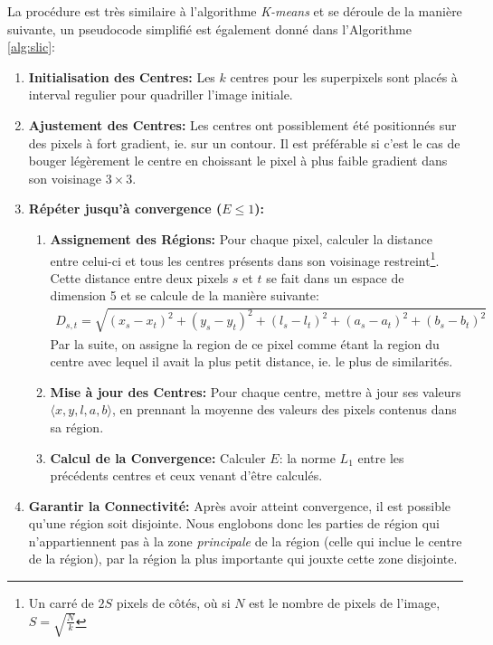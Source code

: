 \documentclass[12pt]{article}
\begin{document}
La proc\'edure est tr\`es similaire \`a l'algorithme \textit{K-means} et se d\'eroule de la mani\`ere suivante, un pseudocode simplifi\'e est \'egalement donn\'e dans l'Algorithme \ref{alg:slic}:

\begin{enumerate}
  \item \textbf{Initialisation des Centres:} Les $k$ centres pour les superpixels sont plac\'es \`a interval regulier pour quadriller l'image initiale.
  \item \textbf{Ajustement des Centres:} Les centres ont possiblement \'et\'e positionn\'es sur des pixels \`a fort gradient, ie. sur un contour.
        Il est pr\'ef\'erable si c'est le cas de bouger l\'eg\`erement le centre en choissant le pixel \`a plus faible gradient dans son voisinage $3\times 3$.
  \item \textbf{R\'ep\'eter jusqu'\`a convergence ($E \leq 1$):}
        \begin{enumerate}
          \item \textbf{Assignement des R\'egions:} Pour chaque pixel, calculer la distance entre celui-ci et tous les centres pr\'esents dans son voisinage restreint\footnote{Un carr\'e de $2S$ pixels de c\^ot\'es, o\`u si $N$ est le nombre de pixels de l'image, $S=\sqrt{\frac{N}{k}}$}.
                Cette distance entre deux pixels $s$ et $t$ se fait dans un espace de dimension 5 et se calcule de la mani\`ere suivante:
                \begin{align*}
                  D_{s,t} = \sqrt{(x_s - x_t)^2 + (y_s - y_t)^2 + (l_s - l_t)^2 + (a_s - a_t)^2 +  (b_s - b_t)^2}
                \end{align*}
                Par la suite, on assigne la region de ce pixel comme \'etant la region du centre avec lequel il avait la plus petit distance,
                ie. le plus de similarit\'es.
          \item \textbf{Mise \`a jour des Centres:} Pour chaque centre, mettre \`a jour ses valeurs $\langle x, y, l, a, b\rangle$,
                en prennant la moyenne des valeurs des pixels contenus dans sa r\'egion.
          \item \textbf{Calcul de la Convergence:} Calculer $E$: la norme $L_1$ entre les pr\'ec\'edents centres et ceux venant d'\^etre calcul\'es.
        \end{enumerate}
  \item \textbf{Garantir la Connectivit\'e:} Apr\`es avoir atteint convergence, il est possible qu'une r\'egion soit disjointe.
        Nous englobons donc les parties de r\'egion qui n'appartiennent pas \`a la zone \textit{principale} de la r\'egion (celle qui inclue le centre de la r\'egion),
        par la r\'egion la plus importante qui jouxte cette zone disjointe.
\end{enumerate}
\end{document}
